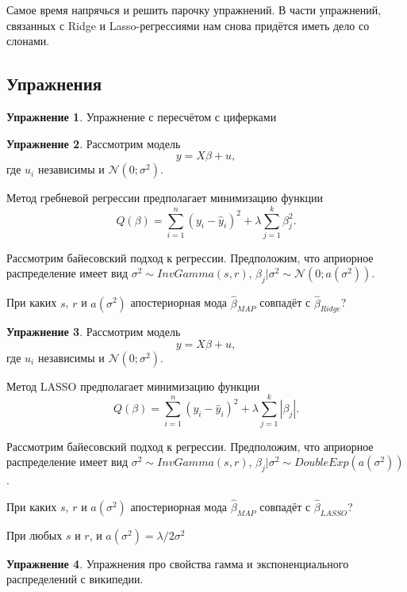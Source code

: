 \documentclass[12pt, a4paper, oneside]{extreport}
\def \mN{\mathcal{N}}
\theoremstyle{plain}              %
\theoremstyle{definition}         %
\newtheorem{problem}{\color{myblue} Упражнение}
\begin{document}
Самое время напрячься и решить парочку упражнений. В части упражнений, связанных с Ridge и Lasso-регрессиями нам снова придётся иметь дело со слонами. 

\subsection*{Упражнения} 

\begin{problem}
Упражнение с пересчётом с циферками
\begin{sol}

\end{sol}
\end{problem}

\begin{problem}
Рассмотрим модель
\[
y = X\beta + u,
\]
где $u_i$ независимы и $\mN(0; \sigma^2)$.

Метод гребневой регрессии предполагает минимизацию функции
\[
Q(\beta) = \sum_{i=1}^n (y_i - \hat y_i)^2 + \lambda \sum_{j=1}^k \beta_j^2.
\]

Рассмотрим байесовский подход к регрессии. Предположим, что априорное распределение имеет вид $\sigma^2 \sim InvGamma(s, r)$, $\beta_j|\sigma^2 \sim \mN(0; a(\sigma^2))$.

При каких $s$, $r$ и $a(\sigma^2)$ апостериорная мода $\hat\beta_{MAP}$ совпадёт с $\hat\beta_{Ridge}$?
\begin{sol}
\end{sol}
\end{problem}

\begin{problem}
Рассмотрим модель
\[
y = X\beta + u,
\]
где $u_i$ независимы и $\mN(0; \sigma^2)$.

Метод LASSO предполагает минимизацию функции
\[
Q(\beta) = \sum_{i=1}^n (y_i - \hat y_i)^2 + \lambda \sum_{j=1}^k |\beta_j|.
\]

Рассмотрим байесовский подход к регрессии. Предположим, что априорное распределение имеет вид $\sigma^2 \sim InvGamma(s, r)$, $\beta_j|\sigma^2 \sim DoubleExp(a(\sigma^2))$.

При каких $s$, $r$ и $a(\sigma^2)$ апостериорная мода $\hat\beta_{MAP}$ совпадёт с $\hat\beta_{LASSO}$?
\begin{sol}
  При любых $s$ и $r$, и $a(\sigma^2)=\lambda/2\sigma^2$
\end{sol}
\end{problem}


\begin{problem}
Упражнения про свойства гамма и экспоненциального распределений с википедии. 
\begin{sol}

\end{sol}
\end{problem}
\end{document}
